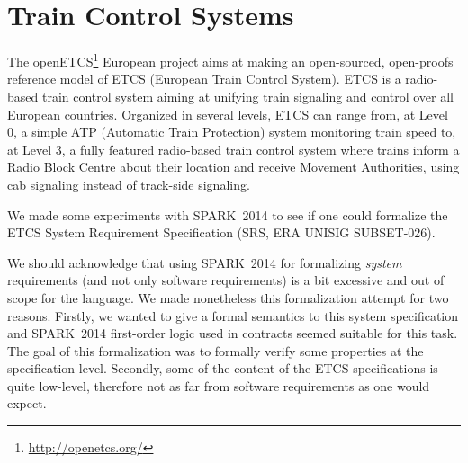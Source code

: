 \documentclass[10pt,a4paper,twocolumn]{article}
\newcommand{\DOC}{\textsc{do-178c}\xspace}
\newcommand{\openetcs}{openETCS\xspace}
\newcommand{\newspark}{SPARK~2014\xspace}
\begin{document}

\section{Train Control Systems}


The \openetcs\footnote{\url{http://openetcs.org/}} European project
aims at making an open-sourced, open-proofs reference model of ETCS
(European Train Control System). ETCS is a radio-based train control
system aiming at unifying train signaling and control over all
European countries. Organized in several levels, ETCS can range from,
at Level 0, a simple ATP (Automatic Train Protection) system
monitoring train speed to, at Level 3, a fully featured radio-based
train control system where trains inform a Radio Block Centre about
their location and receive Movement Authorities, using cab signaling
instead of track-side signaling.

We made some experiments with \newspark to see if one could formalize
the ETCS System Requirement Specification (SRS, ERA UNISIG
SUBSET-026).

We should acknowledge that using \newspark for formalizing
\emph{system} requirements (and not only software requirements) is a
bit excessive and out of scope for the language. We made nonetheless
this formalization attempt for two reasons. Firstly, we wanted to give
a formal semantics to this system specification and \newspark
first-order logic used in contracts seemed suitable for
this task. The goal of this formalization was to formally verify some
properties at the specification level.  Secondly, some of
the content of the ETCS specifications is quite low-level, therefore
not as far from software requirements as one would expect.
\end{document}
